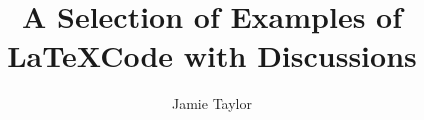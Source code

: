 \documentclass[11pt, a4paper, twoside]{report}
\begin{document}

\title{A Selection of Examples of \LaTeX Code with Discussions}
\author {Jamie Taylor}
\maketitle


\begin{abstract}

%	


%	




\end{abstract}



\tableofcontents
\end{document}
